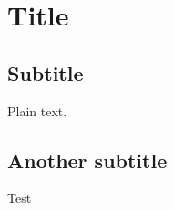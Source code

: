 \documentclass{article}
\begin{document}
 

\section{Title}

\subsection{Subtitle}

Plain text.

\subsection{Another subtitle}


Test
\end{document}
